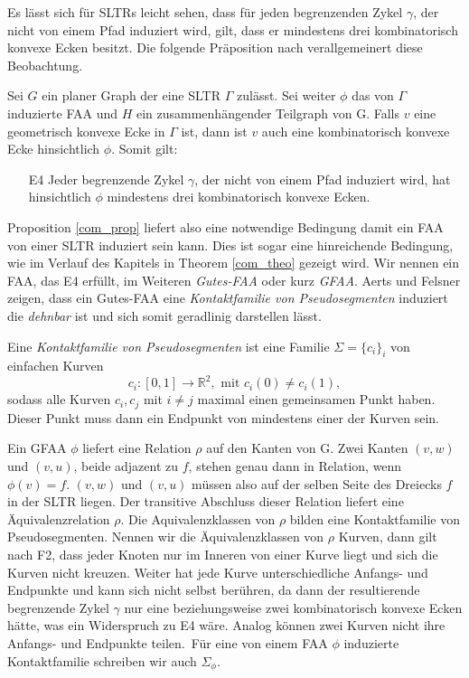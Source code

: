 Es lässt sich für SLTRs leicht sehen, dass für jeden begrenzenden Zykel $\gamma$, der nicht von einem Pfad induziert wird, gilt, dass er mindestens drei kombinatorisch konvexe Ecken besitzt. Die folgende Präposition nach \cite[Prop 2.2, Prop 2.4]{af13} verallgemeinert diese Beobachtung.

\begin{proposition}\label{com_prop}
Sei $G$ ein planer Graph der eine SLTR $\Gamma$ zulässt. Sei weiter $\phi$ das von $\Gamma$ induzierte FAA und $H$ ein zusammenhängender Teilgraph von G. Falls $v$ eine geometrisch konvexe Ecke in $\Gamma$ ist, dann ist $v$ auch eine kombinatorisch konvexe Ecke hinsichtlich $\phi$. Somit gilt:
\begin{itemize}
\item [E4] Jeder begrenzende Zykel $\gamma$, der nicht von einem Pfad induziert wird, hat hinsichtlich $\phi$ mindestens drei kombinatorisch konvexe Ecken.
\end{itemize}

\end{proposition}

Proposition \ref{com_prop} liefert also eine notwendige Bedingung damit ein FAA von einer SLTR induziert sein kann. Dies ist sogar eine hinreichende Bedingung, wie im Verlauf des Kapitels in Theorem \ref{com_theo} gezeigt wird. Wir nennen ein FAA, das E4 erfüllt, im Weiteren \textit{Gutes-FAA} oder kurz \textit{GFAA}. Aerts und Felsner zeigen, dass ein Gutes-FAA eine \textit{Kontaktfamilie von Pseudosegmenten} induziert die \textit{dehnbar} ist und sich somit geradlinig darstellen lässt.

\begin{definition}

Eine \textit{Kontaktfamilie von Pseudosegmenten} ist eine Familie $\Sigma = \{c_i\}_i$ von einfachen Kurven $$c_i:[0,1] \to \mathbb{R}^2, \text{ mit } c_i(0) \neq c_i(1),$$ sodass alle Kurven $c_i,c_j$ mit $i \neq j$ maximal einen gemeinsamen Punkt haben. Dieser Punkt muss dann ein Endpunkt von mindestens einer der Kurven sein.

\end{definition}

Ein GFAA $\phi$ liefert eine Relation $\rho$ auf den Kanten von G. Zwei Kanten $(v,w)$ und $(v,u)$, beide adjazent zu $f$, stehen genau dann in Relation, wenn $\phi(v)=f$. $(v,w)$ und $(v,u)$ müssen also auf der selben Seite  des Dreiecks $f$ in der SLTR liegen. Der transitive Abschluss dieser Relation liefert eine Äquivalenzrelation $\rho$. Die Aquivalenzklassen von $\rho$ bilden eine Kontaktfamilie von Pseudosegmenten. Nennen wir die Äquivalenzklassen von $\rho$ Kurven, dann gilt nach F2, dass jeder Knoten nur im Inneren von einer Kurve liegt und sich die Kurven nicht kreuzen. Weiter hat jede Kurve unterschiedliche Anfangs- und Endpunkte und kann sich nicht selbst berühren, da dann der resultierende begrenzende Zykel $\gamma$ nur eine beziehungsweise zwei kombinatorisch konvexe Ecken hätte, was ein Widerspruch zu E4 wäre. Analog können zwei Kurven nicht ihre Anfangs- und Endpunkte teilen.\
Für eine von einem FAA $\phi$ induzierte Kontaktfamilie schreiben wir auch $\Sigma_{\phi}$.

